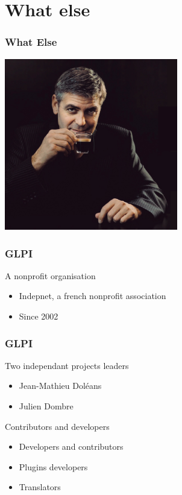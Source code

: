 \documentclass{beamer}
\begin{document}
\section{What else}

\begin{frame}

    \frametitle{What Else}


\includegraphics[height=7.5cm]{./pics/whatelse.jpg}

\end{frame}

\begin{frame}

    \frametitle{GLPI}

    \begin{block}{A nonprofit organisation}
        \begin{itemize}
            \item Indepnet, a french nonprofit association
            \item Since 2002
        \end{itemize}
    \end{block}

\end{frame}

\begin{frame}

    \frametitle{GLPI}

    \begin{block}{Two independant projects leaders}
        \begin{itemize}
            \item Jean-Mathieu Doléans
            \item Julien Dombre
        \end{itemize}
    \end{block}

    \begin{block}{Contributors and developers}
        \begin{itemize}
            \item Developers and contributors
            \item Plugins developers
            \item Translators
        \end{itemize}
    \end{block}

\end{frame}
\end{document}
